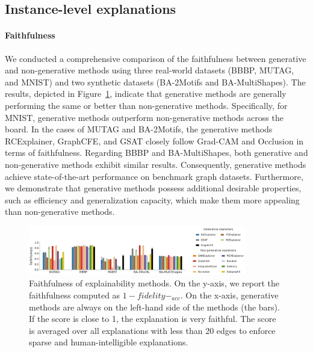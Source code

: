 \subsection{Instance-level explanations}
\paragraph{Faithfulness} We conducted a comprehensive comparison of the faithfulness between generative and non-generative methods using three real-world datasets (BBBP, MUTAG, and MNIST) and two synthetic datasets (BA-2Motifs and BA-MultiShapes). The results, depicted in Figure~\ref{fig:faithfulness}, indicate that generative methods are generally performing the same or better than non-generative methods. Specifically, for MNIST, generative methods outperform non-generative methods across the board. In the cases of MUTAG and BA-2Motifs, the generative methods RCExplainer, GraphCFE, and GSAT closely follow Grad-CAM and Occlusion in terms of faithfulness. Regarding BBBP and BA-MultiShapes, both generative and non-generative methods exhibit similar results. Consequently, generative methods achieve state-of-the-art performance on benchmark graph datasets. Furthermore, we demonstrate that generative methods possess additional desirable properties, such as efficiency and generalization capacity, which make them more appealing than non-generative methods.
\begin{figure}[h!]
    \centering
    \includegraphics[width=0.85\textwidth]{submissions/Rex2023/figures/faithfulness-_5_D4.pdf}
    \caption{Faithfulness of explainability methods. On the y-axis, we report the faithfulness computed as $1-fidelity-_{acc}$. On the x-axis, generative methods are always on the left-hand side of the methods (the bars). If the score is close to 1, the explanation is very faithful. The score is averaged over all explanations with less than 20 edges to enforce sparse and human-intelligible explanations.}
    \label{fig:faithfulness}
\end{figure}
